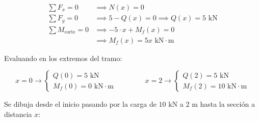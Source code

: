 \begin{center}
\begin{minipage}{0.48\textwidth}
        \begin{align*}

            \sum F_x = 0              & \implies N(x) = 0                                 \\

            \sum F_y = 0              & \implies 5 - Q(x) = 0 \implies Q(x) = 5\text{ kN} \\

            \sum M_{\text{corte}} = 0 & \implies -5 \cdot x + M_f(x) = 0                  \\

                                      & \implies M_f(x) = 5x\text{ kN}\cdot\text{m}

        \end{align*}

    \end{minipage}

\end{center}



Evaluando en los extremos del tramo:

\begin{equation}

    x = 0 \longrightarrow \begin{cases} Q(0) = 5\text{ kN} \\ M_f(0) = 0\text{ kN}\cdot\text{m} \end{cases}

    \qquad\qquad

    x = 2 \longrightarrow \begin{cases} Q(2) = 5\text{ kN} \\ M_f(2) = 10\text{ kN}\cdot\text{m} \end{cases}

\end{equation}






Se dibuja desde el inicio pasando por la carga de $10\text{ kN}$ a $2\text{ m}$ hasta la sección a distancia $x$:



